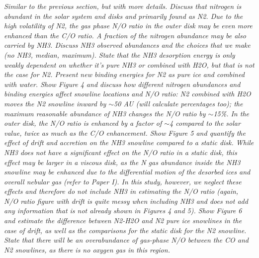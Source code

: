 \documentclass[apj]{emulateapj}
\newcommand{\emgr}[1]{\emph{ \color{gray} #1}}
\begin{document}
\emgr{Similar to the previous section, but with more details. Discuss that nitrogen is abundant in the solar system and disks and primarily found as N2. Due to the high volatility of N2, the gas phase N/O ratio in the outer disk may be even more enhanced than the C/O ratio. A fraction of the nitrogen abundance may be also carried by NH3. Discuss NH3 observed abundances and the choices that we make (no NH3, median, maximum). State that the NH3 desorption energy is only weakly dependent on whether it's pure NH3 or combined with H2O, but that is not the case for N2. Present new binding energies for N2 as pure ice and combined with water. Show Figure 4 and discuss how different nitrogen abundances and binding energies affect snowline locations and N/O ratio: N2 combined with H2O moves the N2 snowline inward by $\sim$50 AU (will calculate percentages too); the maximum reasonable abundance of NH3 changes the N/O ratio by $\sim$15\%. In the outer disk, the N/O ratio is enhanced by a factor of $\sim$4 compared to the solar value, twice as much as the C/O enhancement. Show Figure 5 and quantify the effect of drift and accretion on the NH3 snowline compared to a static disk. While NH3 does not have a significant effect on the N/O ratio in a static disk, this effect may be larger in a viscous disk, as the N gas abundance inside the NH3 snowline may be enhanced due to the differential motion of the desorbed ices and overall nebular gas (refer to Paper I). In this study, however, we neglect these effects and therefore do not include NH3 in estimating the N/O ratio (again, N/O ratio figure with drift is quite messy when including NH3 and does not add any information that is not already shown in Figures 4 and 5). Show Figure 6 and estimate the difference between N2-H2O and N2 pure ice snowlines in the case of drift, as well as the comparisons for the static disk for the N2 snowline. State that there will be an overabundance of gas-phase N/O between the CO and N2 snowlines, as there is no oxygen gas in this region.}
\end{document}

